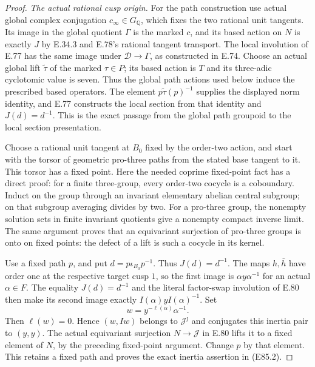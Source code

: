 \begin{proof}
\emph{The actual rational cusp origin.}
For the path construction use actual global complex conjugation
$c_\infty\in G_{\mathbb Q}$, which fixes the two rational unit
 tangents. Its image in the global quotient $\Gamma$ is the marked
$c$, and its based action on $N$ is exactly $J$ by E.34.3 and
E.78's rational tangent transport. The local involution of E.77
has the same image under $\mathcal D\to\Gamma$, as constructed
in E.74. Choose an actual global lift $\widetilde\tau$ of the
marked $\tau\in P$; its based action is $T$ and its three-adic
cyclotomic value is seven. Thus the global path actions used below
induce the prescribed based operators. The element
$p\widetilde\tau(p)^{-1}$ supplies the displayed norm identity,
and E.77 constructs the local section from that identity and
$J(d)=d^{-1}$. This is the exact passage from the global path
groupoid to the local section presentation.

Choose a rational unit tangent at $B_0$ fixed by
the order-two action, and start with the torsor
of geometric pro-three paths from the stated
base tangent to it. This torsor has a fixed
point. Here the needed coprime fixed-point fact
has a direct proof: for a finite three-group,
every order-two cocycle is a coboundary. Induct
on the group through an invariant elementary
abelian central subgroup; on that subgroup
averaging divides by two. For a pro-three group,
the nonempty solution sets in finite invariant
quotients give a nonempty compact inverse limit.
The same argument proves that an equivariant
surjection of pro-three groups is onto on fixed
points: the defect of a lift is such a cocycle
in its kernel.

Use a fixed path $p$, and put
$d=p\iota_{B_0}p^{-1}$. Thus $J(d)=d^{-1}$.
The maps $h,\bar h$ have order one at the
respective target cusp $1$, so the first image
is $\alpha y\alpha^{-1}$ for an actual
$\alpha\in F$. The equality $J(d)=d^{-1}$ and
the literal factor-swap involution of E.80
then make its second image exactly
$I(\alpha)yI(\alpha)^{-1}$. Set
\[
       w=y^{-\ell(\alpha)}\alpha^{-1}.
 \tag{E85.19}
\]
Then $\ell(w)=0$. Hence $(w,Iw)$ belongs to
$\mathcal J^{\jmath}$ and conjugates this inertia
pair to $(y,y)$. The actual equivariant
surjection $N\to\mathcal J$ in E.80 lifts it
to a fixed element of $N$, by the preceding
fixed-point argument. Change $p$ by that
element. This retains a fixed path and proves
the exact inertia assertion in (E85.2).


\end{proof}
